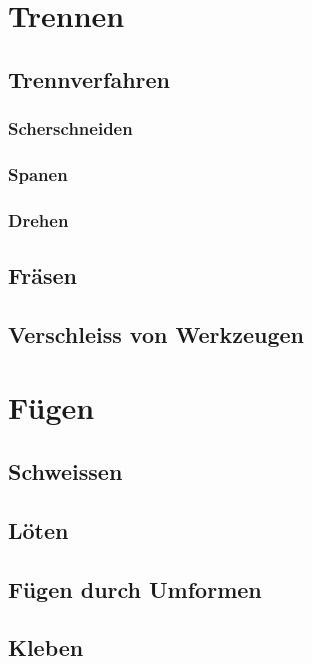 \documentclass[12pt]{cheatsheet}
\begin{document}
\section*{Trennen}
    \subsection*{Trennverfahren}
    
    \vfill \null \columnbreak
    \subsubsection*{Scherschneiden}
    
    \subsubsection*{Spanen}
    
    \subsubsection*{Drehen}
    
    \subsection{Fräsen}
    
    \subsection*{Verschleiss von Werkzeugen}
    

\section*{Fügen}
    
    \subsection*{Schweissen}
    
    \subsection*{Löten}
    
    \subsection*{Fügen durch Umformen}
    
    \subsection*{Kleben}
    
\end{document}
